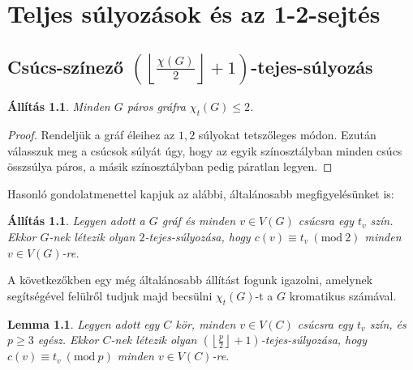 \documentclass[12pt, a4paper]{report}
\newtheorem{lem}[tét]{Lemma}
\newtheorem{áll}[tét]{Állítás}
\theoremstyle{remark}
\theoremstyle{definition}
\begin{document}
\chapter{Teljes súlyozások és az 1-2-sejtés}

\section{Csúcs-színező $\left( \left\lfloor \frac{χ(G)}{2} \right\rfloor + 1 \right)$-tejes-súlyozás}

\begin{áll}
Minden $G$ páros gráfra $\chi_t(G) \leq 2$.
\end{áll}

\begin{proof}
Rendeljük a gráf éleihez az $1, 2$ súlyokat tetszőleges módon. Ezután válasszuk meg a csúcsok súlyát úgy, hogy az egyik színosztályban minden csúcs összsúlya páros, a másik színosztályban pedig páratlan legyen.
\end{proof}

Hasonló gondolatmenettel kapjuk az alábbi, általánosabb megfigyelésünket is:

\begin{áll}
Legyen adott a $G$ gráf és minden $v \in V(G)$ csúcsra egy $t_v$ szín. Ekkor $G$-nek létezik olyan $2$-tejes-súlyozása, hogy $c(v) ≡ t_v\ (\mathrm{mod}\ 2)$ minden $v \in V(G)$-re. 
\end{áll}

A következőkben egy még általánosabb állítást fogunk igazolni, amelynek segítségével felülről tudjuk majd becsülni $\chi_t(G)$-t a $G$ kromatikus számával.

\begin{lem} \label{lem:totalcircle}
Legyen adott egy $C$ kör, minden $v \in V(C)$ csúcsra egy $t_v$ szín, és $p \geq 3$ egész. Ekkor $C$-nek létezik olyan $\left( \left\lfloor \frac{p}{2} \right\rfloor + 1 \right)$-tejes-súlyozása, hogy $c(v) ≡ t_v\ (\mathrm{mod}\ p)$ minden $v \in V(C)$-re.
\end{lem}
\end{document}
